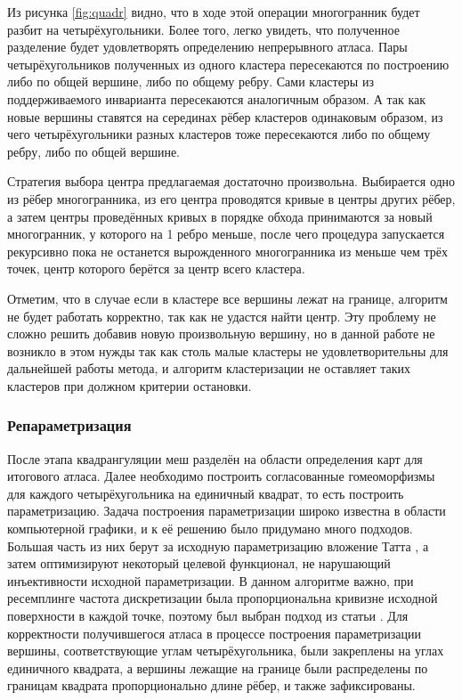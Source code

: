 \documentclass[12pt]{extarticle}
\begin{document}
Из рисунка \ref{fig:quadr} видно, что в ходе этой операции многогранник будет разбит на четырёхугольники. Более того, легко увидеть, что полученное разделение будет удовлетворять определению непрерывного атласа. Пары четырёхугольников полученных из одного кластера пересекаются по построению либо по общей вершине, либо по общему ребру. Сами кластеры из поддерживаемого инварианта пересекаются аналогичным образом. А так как новые вершины ставятся на серединах рёбер кластеров одинаковым образом, из чего четырёхугольники разных кластеров тоже пересекаются либо по общему ребру, либо по общей вершине.

Стратегия выбора центра предлагаемая \cite{purnomo2004} достаточно произвольна. Выбирается одно из рёбер многогранника, из его центра проводятся кривые в центры других рёбер, а затем центры проведённых кривых в порядке обхода принимаются за новый многогранник, у которого на 1 ребро меньше, после чего процедура запускается рекурсивно пока не останется вырожденного многогранника из меньше чем трёх точек, центр которого берётся за центр всего кластера.

Отметим, что в случае если в кластере все вершины лежат на границе, алгоритм не будет работать корректно, так как не удастся найти центр. Эту проблему не сложно решить добавив новую произвольную вершину, но в данной работе не возникло в этом нужды так как столь малые кластеры не удовлетворительны для дальнейшей работы метода, и алгоритм кластеризации не оставляет таких кластеров при должном критерии остановки.

\subsubsection{Репараметризация}
После этапа квадрангуляции меш разделён на области определения карт для итогового атласа. Далее необходимо построить согласованные гомеоморфизмы для каждого четырёхугольника на единичный квадрат, то есть построить параметризацию. Задача построения параметризации широко известна в области компьютерной графики, и к её решению было придумано много подходов. Большая часть из них берут за исходную параметризацию вложение Татта \cite{tutte1963}, а затем оптимизируют некоторый целевой функционал, не нарушающий инъективности исходной параметризации. В данном алгоритме важно, при ресемплинге частота дискретизации была пропорциональна кривизне исходной поверхности в каждой точке, поэтому был выбран подход из статьи \cite{sander2001}. Для корректности получившегося атласа в процессе построения параметризации вершины, соответствующие углам четырёхугольника, были закреплены на углах единичного квадрата, а вершины лежащие на границе были распределены по границам квадрата пропорционально длине рёбер, и также зафиксированы.
\end{document}
